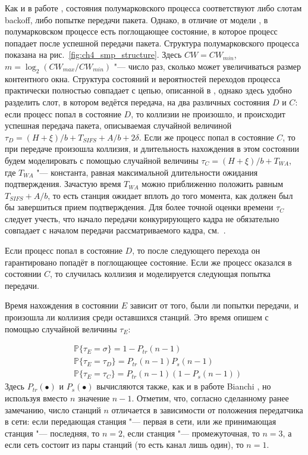 Как и в работе \cite{Bianchi2000}, состояния полумарковского процесса соответствуют либо слотам backoff, либо попытке передачи пакета. Однако, в отличие от модели \cite{Bianchi2000}, в полумарковском процессе есть поглощающее состояние, в которое процесс попадает после успешной передачи пакета. Структура полумарковского процесса показана на рис.~\ref{fig:ch4_smp_structure}. Здесь $CW = CW_{min}$, $m = \log_2(CW_{max}/CW_{min})$ "--- число раз, сколько может увеличиваться размер контентного окна. Структура состояний и вероятностей переходов процесса практически полностью совпадает с цепью, описанной в \cite{Bianchi2000}, однако здесь удобно разделить слот, в котором ведётся передача, на два различных состояния $D$ и $C$: если процесс попал в состояние $D$, то коллизии не произошло, и происходит успешная передача пакета, описываемая случайной величиной $\tau_D = (H + \xi)/b + T_{SIFS} + A/b + 2\delta$. Если же процесс попал в состояние $C$, то при передаче произошла коллизия, и длительность нахождения в этом состоянии будем моделировать с помощью случайной величины $\tau_C = (H + \xi)/b + T_{WA}$, где $T_{WA}$ "--- константа, равная максимальной длительности ожидания подтверждения. Зачастую время $T_{WA}$ можно приближенно положить равным $T_{SIFS} + A/b$, то есть станция ожидает вплоть до того момента, как должен был бы завершиться прием подтверждения. Для более точной оценки времени $\tau_C$ следует учесть, что начало передачи конкурирующего кадра не обязательно совпадает с началом передачи рассматриваемого кадра, см.~\cite{Bianchi2000}.

Если процесс попал в состояние $D$, то после следующего перехода он гарантировано попадёт в поглощающее состояние. Если же процесс оказался в состоянии $C$, то случилась коллизия и моделируется следующая попытка передачи.

Время нахождения в состоянии $E$ зависит от того, были ли попытки передачи, и произошла ли коллизия среди оставшихся станций. Это время опишем с помощью случайной величины $\tau_E$:

$$
  \begin{aligned}
    &\mathbb{P}\{\tau_E = \sigma\} = 1 - P_{tr}(n-1)\\
    &\mathbb{P}\{\tau_E = \tau_D\} = P_{tr}(n-1) P_s(n-1)\\
    &\mathbb{P}\{\tau_E = \tau_C\} = P_{tr}(n-1)(1 - P_s(n-1))
  \end{aligned}
$$
Здесь $P_{tr}(\bullet)$ и $P_s(\bullet)$ вычисляются также, как и в работе Bianchi \cite{Bianchi2000}, но используя вместо $n$ значение $n-1$. Отметим, что, согласно сделанному ранее замечанию, число станций $n$ отличается в зависимости от положения передатчика в сети: если передающая станция "--- первая в сети, или же принимающая станция "--- последняя, то $n = 2$, если станция "--- промежуточная, то $n = 3$, а если сеть состоит из пары станций (то есть канал лишь один), то $n = 1$.

